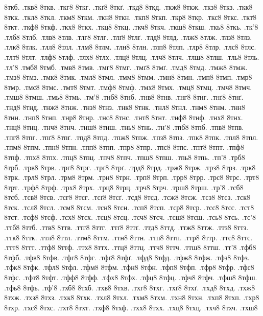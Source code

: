 {8ткб.
.ткв8
8ткв.
.ткг8
8ткг.
.ткґ8
8ткґ.
.ткд8
8ткд.
.ткж8
8ткж.
.ткз8
8ткз.
.ткк8
8ткк.
.ткл8
8ткл.
.ткм8
8ткм.
.ткн8
8ткн.
.ткп8
8ткп.
.ткр8
8ткр.
.ткс8
8ткс.
.ткт8
8ткт.
.ткф8
8ткф.
.ткх8
8ткх.
.ткц8
8ткц.
.ткч8
8ткч.
.ткш8
8ткш.
.ткь8
8ткь.
.тк'8
.тлб8
8тлб.
.тлв8
8тлв.
.тлг8
8тлг.
.тлґ8
8тлґ.
.тлд8
8тлд.
.тлж8
8тлж.
.тлз8
8тлз.
.тлк8
8тлк.
.тлл8
8тлл.
.тлм8
8тлм.
.тлн8
8тлн.
.тлп8
8тлп.
.тлр8
8тлр.
.тлс8
8тлс.
.тлт8
8тлт.
.тлф8
8тлф.
.тлх8
8тлх.
.тлц8
8тлц.
.тлч8
8тлч.
.тлш8
8тлш.
.тль8
8тль.
.тл'8
.тмб8
8тмб.
.тмв8
8тмв.
.тмг8
8тмг.
.тмґ8
8тмґ.
.тмд8
8тмд.
.тмж8
8тмж.
.тмз8
8тмз.
.тмк8
8тмк.
.тмл8
8тмл.
.тмм8
8тмм.
.тмн8
8тмн.
.тмп8
8тмп.
.тмр8
8тмр.
.тмс8
8тмс.
.тмт8
8тмт.
.тмф8
8тмф.
.тмх8
8тмх.
.тмц8
8тмц.
.тмч8
8тмч.
.тмш8
8тмш.
.тмь8
8тмь.
.тм'8
.тнб8
8тнб.
.тнв8
8тнв.
.тнг8
8тнг.
.тнґ8
8тнґ.
.тнд8
8тнд.
.тнж8
8тнж.
.тнз8
8тнз.
.тнк8
8тнк.
.тнл8
8тнл.
.тнм8
8тнм.
.тнн8
8тнн.
.тнп8
8тнп.
.тнр8
8тнр.
.тнс8
8тнс.
.тнт8
8тнт.
.тнф8
8тнф.
.тнх8
8тнх.
.тнц8
8тнц.
.тнч8
8тнч.
.тнш8
8тнш.
.тнь8
8тнь.
.тн'8
.тпб8
8тпб.
.тпв8
8тпв.
.тпг8
8тпг.
.тпґ8
8тпґ.
.тпд8
8тпд.
.тпж8
8тпж.
.тпз8
8тпз.
.тпк8
8тпк.
.тпл8
8тпл.
.тпм8
8тпм.
.тпн8
8тпн.
.тпп8
8тпп.
.тпр8
8тпр.
.тпс8
8тпс.
.тпт8
8тпт.
.тпф8
8тпф.
.тпх8
8тпх.
.тпц8
8тпц.
.тпч8
8тпч.
.тпш8
8тпш.
.тпь8
8тпь.
.тп'8
.трб8
8трб.
.трв8
8трв.
.трг8
8трг.
.трґ8
8трґ.
.трд8
8трд.
.трж8
8трж.
.трз8
8трз.
.трк8
8трк.
.трл8
8трл.
.трм8
8трм.
.трн8
8трн.
.трп8
8трп.
.трр8
8трр.
.трс8
8трс.
.трт8
8трт.
.трф8
8трф.
.трх8
8трх.
.трц8
8трц.
.трч8
8трч.
.трш8
8трш.
.тр'8
.тсб8
8тсб.
.тсв8
8тсв.
.тсг8
8тсг.
.тсґ8
8тсґ.
.тсд8
8тсд.
.тсж8
8тсж.
.тсз8
8тсз.
.тск8
8тск.
.тсл8
8тсл.
.тсм8
8тсм.
.тсн8
8тсн.
.тсп8
8тсп.
.тср8
8тср.
.тсс8
8тсс.
.тст8
8тст.
.тсф8
8тсф.
.тсх8
8тсх.
.тсц8
8тсц.
.тсч8
8тсч.
.тсш8
8тсш.
.тсь8
8тсь.
.тс'8
.ттб8
8ттб.
.ттв8
8ттв.
.ттг8
8ттг.
.ттґ8
8ттґ.
.ттд8
8ттд.
.ттж8
8ттж.
.ттз8
8ттз.
.ттк8
8ттк.
.ттл8
8ттл.
.ттм8
8ттм.
.ттн8
8ттн.
.ттп8
8ттп.
.ттр8
8ттр.
.ттс8
8ттс.
.ттт8
8ттт.
.ттф8
8ттф.
.ттх8
8ттх.
.ттц8
8ттц.
.ттч8
8ттч.
.ттш8
8ттш.
.тт'8
.тфб8
8тфб.
.тфв8
8тфв.
.тфг8
8тфг.
.тфґ8
8тфґ.
.тфд8
8тфд.
.тфж8
8тфж.
.тфз8
8тфз.
.тфк8
8тфк.
.тфл8
8тфл.
.тфм8
8тфм.
.тфн8
8тфн.
.тфп8
8тфп.
.тфр8
8тфр.
.тфс8
8тфс.
.тфт8
8тфт.
.тфф8
8тфф.
.тфх8
8тфх.
.тфц8
8тфц.
.тфч8
8тфч.
.тфш8
8тфш.
.тфь8
8тфь.
.тф'8
.тхб8
8тхб.
.тхв8
8тхв.
.тхг8
8тхг.
.тхґ8
8тхґ.
.тхд8
8тхд.
.тхж8
8тхж.
.тхз8
8тхз.
.тхк8
8тхк.
.тхл8
8тхл.
.тхм8
8тхм.
.тхн8
8тхн.
.тхп8
8тхп.
.тхр8
8тхр.
.тхс8
8тхс.
.тхт8
8тхт.
.тхф8
8тхф.
.тхх8
8тхх.
.тхц8
8тхц.
.тхч8
8тхч.
.тхш8
}
